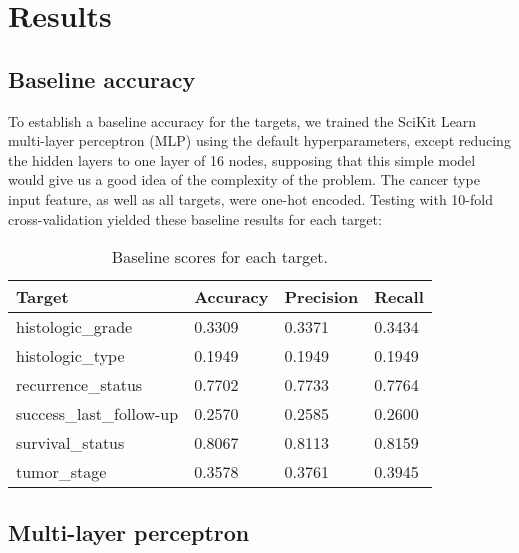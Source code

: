 \documentclass{article}
\begin{document}
\section{Results}

\subsection{Baseline accuracy}

To establish a baseline accuracy for the targets, we trained the SciKit Learn multi-layer perceptron (MLP) using the default hyperparameters, except reducing the hidden layers to one layer of 16 nodes, supposing that this simple model would give us a good idea of the complexity of the problem. The cancer type input feature, as well as all targets, were one-hot encoded. Testing with 10-fold cross-validation yielded these baseline results for each target:

\medskip

\begin{table}[H]
\begin{center}
\begin{tabular}{ *{4}{l} }
    \multicolumn{1}{p{1.5cm}}{\raggedright Target} &  
    \multicolumn{1}{p{1.5cm}}{\raggedright Accuracy} &  
    \multicolumn{1}{p{1.5cm}}{\raggedright Precision} &  
    \multicolumn{1}{p{1.5cm}}{\raggedright Recall} \\ \hline
histologic\_grade       &         0.3309 &          0.3371 &       0.3434 \\
histologic\_type        &         0.1949 &          0.1949 &       0.1949 \\
recurrence\_status      &         0.7702 &          0.7733 &       0.7764 \\
success\_last\_follow-up &         0.2570 &          0.2585 &       0.2600 \\
survival\_status        &         0.8067 &          0.8113 &       0.8159 \\
tumor\_stage            &         0.3578 &          0.3761 &       0.3945 \\
\end{tabular}
\caption{Baseline scores for each target.}
\end{center}
\end{table}

\subsection{Multi-layer perceptron}
\end{document}
